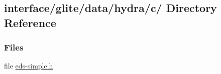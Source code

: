 \hypertarget{dir_000004}{
\subsection{interface/glite/data/hydra/c/ Directory Reference}
\label{dir_000004}
}
\subsubsection*{Files}
\begin{CompactItemize}
\item 
file \hyperlink{eds-simple_8h}{eds-simple.h}
\end{CompactItemize}
